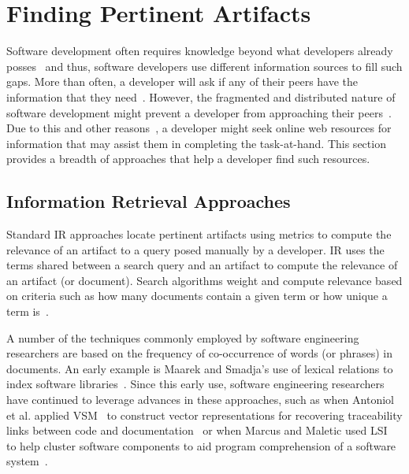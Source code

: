 \section{Finding Pertinent Artifacts}
\label{cp2:foraging-tools}



Software development often requires knowledge beyond what developers already posses~\cite{Li2013} and thus, 
software developers use different information sources to fill such gaps. 
More than often, a developer will ask if any of their 
peers have the information that they need~\cite{singer2011}. 
However, the fragmented and distributed nature of software development  
might prevent a developer from approaching their peers~\cite{ko2007}.
Due to this and other reasons~\cite{Xia2017, rao2020}, a developer might seek
online web resources for information 
that may assist them in completing the task-at-hand.
This section provides a breadth of approaches that help a developer find such resources.




\subsection{Information Retrieval Approaches} 
\label{cp2:ir-approaches}





Standard \acf{IR} approaches locate pertinent artifacts
using metrics to compute the relevance of an artifact to a query posed manually by a developer.
\acs{IR} uses the terms shared between a search query and an artifact
to compute the relevance of an artifact (or document).
Search algorithms weight and compute relevance based on 
criteria such as how many documents contain a given term or  
how unique a term is~\cite{Manning2009IR}.



A number of the techniques commonly employed by software engineering researchers are based on the
frequency of co-occurrence of words (or phrases) in documents.
An early example is Maarek and Smadja's use of lexical relations to index
software libraries~\cite{maarek1989}.
Since this early use, software engineering
researchers have continued to leverage advances in
these approaches, such as when
Antoniol et al. applied \acf{VSM}~\cite{Salton1975vsm} 
to construct vector representations 
for recovering traceability links 
between code and documentation~\cite{antoniol1999, antoniol2000}
or when Marcus and Maletic used \acf{LSI}~\cite{deerwester1990LSI}
to help cluster software components to aid
program comprehension of a software system~\cite{Marcus2003}.



